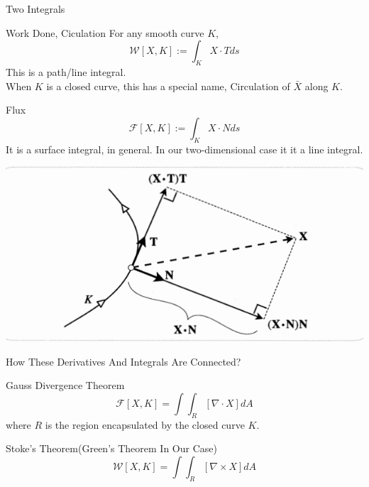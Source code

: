 \documentclass[9pt]{beamer}
\begin{document}
\begin{frame}{Two Integrals}
  \begin{block}{Work Done, Ciculation}
    For any smooth curve $K$, 
    $$\mathcal{W}[X,K]:=\int_KX\cdot Tds$$
    This is a path/line integral.\\
    When $K$ is a closed curve, this has a special name, Circulation of $\bar{X}$ along $K$.
  \end{block}
  \pause
  \begin{block}{Flux}
    $$\mathcal{F}[X,K]:=\int_KX\cdot Nds$$
    It is a surface integral, in general. In our two-dimensional case it it a line integral.
  \end{block}
\end{frame}

\begin{frame}
  \begin{center}
    \includegraphics[scale=0.5]{integrals.png}
  \end{center}
\end{frame}  

\begin{frame}{How These Derivatives And Integrals Are Connected?}
  \begin{block}{Gauss Divergence Theorem}
    $$\mathcal{F}[X,K]=\int\int_R[\nabla\cdot X]dA$$
    where $R$ is the region encapsulated by the closed curve $K$. 
  \end{block}
  \pause  
  \begin{block}{Stoke's Theorem(Green's Theorem In Our Case)}
    $$\mathcal{W}[X,K]=\int\int_R[\nabla\times X]dA$$
  \end{block}
  
\end{frame}
\end{document}
